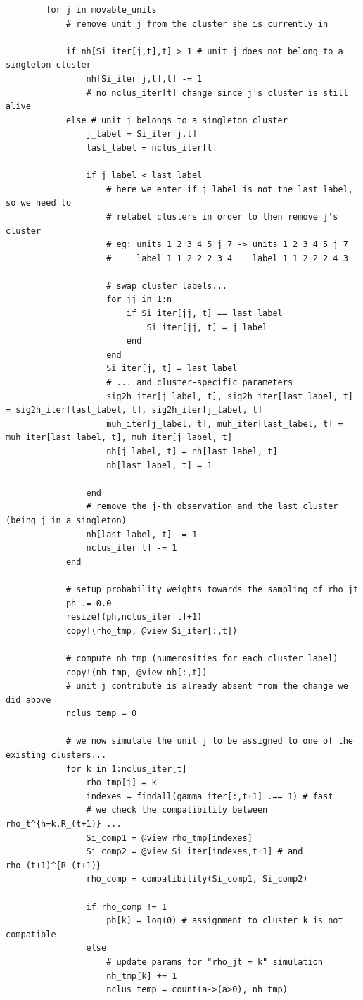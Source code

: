 \documentclass[12pt,	%
	a4paper,		%
	twoside,		%
	openright,		%
	titlepage,%
	]{book}
\theoremstyle{definition}
\newenvironment{code}{\captionsetup{type=listing}}{}
\begin{document}
\begin{code}
\begin{verbatim}
		for j in movable_units
			# remove unit j from the cluster she is currently in

			if nh[Si_iter[j,t],t] > 1 # unit j does not belong to a singleton cluster
				nh[Si_iter[j,t],t] -= 1
				# no nclus_iter[t] change since j's cluster is still alive
			else # unit j belongs to a singleton cluster
				j_label = Si_iter[j,t]
				last_label = nclus_iter[t]

				if j_label < last_label
					# here we enter if j_label is not the last label, so we need to
					# relabel clusters in order to then remove j's cluster
					# eg: units 1 2 3 4 5 j 7 -> units 1 2 3 4 5 j 7
					#     label 1 1 2 2 2 3 4    label 1 1 2 2 2 4 3

					# swap cluster labels...
					for jj in 1:n
						if Si_iter[jj, t] == last_label
							Si_iter[jj, t] = j_label
						end
					end
					Si_iter[j, t] = last_label
					# ... and cluster-specific parameters
					sig2h_iter[j_label, t], sig2h_iter[last_label, t] = sig2h_iter[last_label, t], sig2h_iter[j_label, t]
					muh_iter[j_label, t], muh_iter[last_label, t] = muh_iter[last_label, t], muh_iter[j_label, t]
					nh[j_label, t] = nh[last_label, t]
					nh[last_label, t] = 1

				end
				# remove the j-th observation and the last cluster (being j in a singleton)
				nh[last_label, t] -= 1
				nclus_iter[t] -= 1
			end

			# setup probability weights towards the sampling of rho_jt
			ph .= 0.0
			resize!(ph,nclus_iter[t]+1)
			copy!(rho_tmp, @view Si_iter[:,t])

			# compute nh_tmp (numerosities for each cluster label)
			copy!(nh_tmp, @view nh[:,t])
			# unit j contribute is already absent from the change we did above
			nclus_temp = 0
				
			# we now simulate the unit j to be assigned to one of the existing clusters...
			for k in 1:nclus_iter[t]
				rho_tmp[j] = k
				indexes = findall(gamma_iter[:,t+1] .== 1) # fast
				# we check the compatibility between rho_t^{h=k,R_(t+1)} ...
				Si_comp1 = @view rho_tmp[indexes]
				Si_comp2 = @view Si_iter[indexes,t+1] # and rho_(t+1)^{R_(t+1)}
				rho_comp = compatibility(Si_comp1, Si_comp2)
				
				if rho_comp != 1
					ph[k] = log(0) # assignment to cluster k is not compatible
				else
					# update params for "rho_jt = k" simulation
					nh_tmp[k] += 1
					nclus_temp = count(a->(a>0), nh_tmp) 


\end{verbatim}
\end{code}
\end{document}
